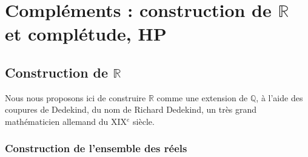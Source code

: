 \documentclass[french]{book}
\newcommand{\R}{\mathbb{R}}
\theoremstyle{plain}
\theoremstyle{definition}
\theoremstyle{remark}
\begin{document}
\section{Compléments : construction de $\R$ et complétude, HP}
\subsection{Construction de $\mathbb{R}$}

Nous nous proposons ici de construire $\mathbb{R}$ comme une extension de $\mathbb{Q}$, à l'aide des coupures de Dedekind, du nom de Richard Dedekind, un très grand mathématicien allemand du XIX$^e$ siècle.

\subsubsection{Construction de l'ensemble des réels}
\end{document}
